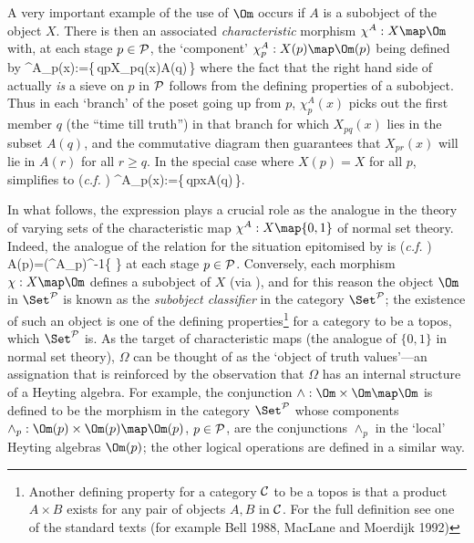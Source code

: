 	A very important example of the use of $\Om$ occurs if $A$ is a
subobject of the object $X$.  There is then an associated {\em
characteristic\/} morphism $\chi^A:X\map\Om$ with, at each stage
$p\in\cal P$, the `component' $\chi^A_p:X(p)\map\Om(p)$ being
defined by
\beq
	\chi^A_p(x):=\{\,q\geq p\mid X_{pq}(x)\in A(q)\,\}\label{Def:chiAp+}
\eeq
where the fact that the right hand side of  actually
{\em is\/} a sieve on $p$ in $\cal P$ follows from the defining
properties of a subobject. Thus in each `branch' of the poset going
up from $p$, $\chi^A_p(x)$ picks out the first member $q$ (the
``time till truth'') in that branch for which $X_{pq}(x)$ lies in
the subset $A(q)$, and the commutative diagram  then
guarantees that $X_{pr}(x)$ will lie in $A(r)$ for all $r\geq q$. In
the special case where $X(p)=X$ for all $p$,
 simplifies to ({\em c.f.} )
\beq
	\chi^A_p(x):=\{\,q\geq p\mid x\in A(q)\,\}\label{Def:chiAp}.
\eeq

	In what follows, the expression  plays a crucial
role as the analogue in the theory of varying sets of the
characteristic map  $\chi^A:X\map\{0,1\}$ of normal set
theory.  Indeed, the analogue of the relation  for the
situation epitomised by  is ({\em c.f.}
)
\beq
		A(p)=(\chi^A_p)^{-1}\{\,\,\}			\label{A(p)=upp}
\eeq
at each stage $p\in\cal P$. Conversely, each morphism
$\chi:X\map\Om$ defines a subobject of $X$ (via
), and for this reason the object $\Om$ in $\Set^{\cal
P}$ is known as the {\em subobject classifier\/} in the category
$\Set^{\cal P}$; the existence of such an object is one of the
defining properties\footnote{Another defining property for a
category $\cal C$ to be a topos is that a product $A\times B$ exists
for any pair of objects $A,B$ in $\cal C$. For the full definition
see one of the standard texts (for example Bell 1988, MacLane and
Moerdijk 1992)} for a category to be a topos, which $\Set^{\cal P}$
is. As the target of characteristic maps (\ie the analogue of
$\{0,1\}$ in normal set theory), $\Omega$ can be thought of as the
`object of truth values'---an assignation that is reinforced by the
observation that $\Omega$ has an internal structure of a Heyting
algebra. For example, the conjunction $\land:\Om\times\Om\map\Om$ is
defined to be the morphism in the category $\Set^{\cal P}$ whose
components $\land_p:\Om(p)\times\Om(p)\map\Om(p)$, $p\in\cal P$, are
the conjunctions $\land_p$ in the `local' Heyting algebras $\Om(p)$;
the other logical operations are defined in a similar way.

